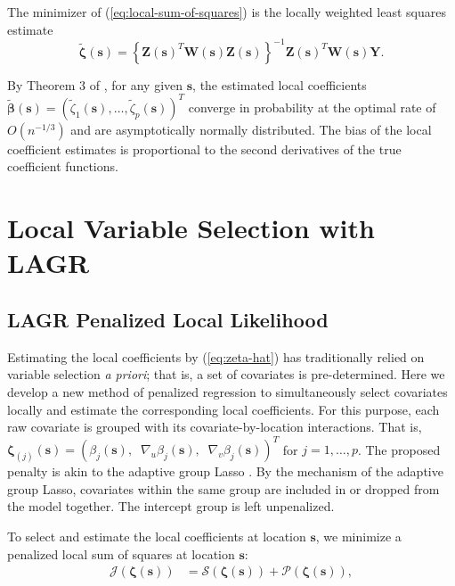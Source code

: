 \documentclass[authoryear,review, 12pt]{elsarticle}
\begin{document}
The minimizer of (\ref{eq:local-sum-of-squares}) is the locally weighted least squares estimate
\begin{equation}
\tilde{\bm{\zeta}}(\bm{s})=\left\{ \bm{Z}(\bm{s})^{T}\bm{W}\!(\bm{s})\bm{Z}(\bm{s})\right\} ^{-1}\bm{Z}(\bm{s})^{T}\bm{W}\!(\bm{s})\bm{Y}.\label{eq:zeta-hat}
\end{equation}

By Theorem 3 of \citet{Sun-Yan-Zhang-Lu-2014}, for any given $\bm{s}$,
the estimated local coefficients $\tilde{\bm{\beta}}(\bm{s})=\left(\tilde{\zeta}_{1}(\bm{s}),\dots,\tilde{\zeta}_{p}(\bm{s})\right)^{T}$
converge in probability at the optimal rate of $O\left(n^{-1/3}\right)$
and are asymptotically normally distributed. The bias of the local
coefficient estimates is proportional to the second derivatives of
the true coefficient functions.

\section{Local Variable Selection with LAGR\label{sec:lagr-gaussian}}

\subsection{LAGR Penalized Local Likelihood}

Estimating the local coefficients by (\ref{eq:zeta-hat}) has traditionally
relied on variable selection \emph{a priori}; that is, a set of covariates
is pre-determined. Here we develop a new method of penalized regression
to simultaneously select covariates locally and estimate the corresponding
local coefficients. For this purpose, each raw covariate is grouped
with its covariate-by-location interactions. That is, $\bm{\zeta}_{(j)}(\bm{s})=\left(\beta_{j}(\bm{s}),\;\;\nabla_{u}\beta_{j}(\bm{s}),\;\;\nabla_{v}\beta_{j}(\bm{s})\right)^{T}$
for $j=1,\dots,p$. The proposed penalty is akin to the adaptive
group Lasso \citep{Yuan-Lin-2006,Wang-Leng-2008}. By the mechanism
of the adaptive group Lasso, covariates within the same group are
included in or dropped from the model together. The intercept group
is left unpenalized.

To select and estimate the local coefficients at location $\bm{s}$,
we minimize a penalized local sum of squares at location $\bm{s}$:
\begin{align}
\mathcal{J}\left(\bm{\zeta}(\bm{s})\right) & =\mathcal{S}\left(\bm{\zeta}(\bm{s})\right)+\mathcal{P}\left(\bm{\zeta}(\bm{s})\right),\label{eq:penalized-least-squares}
\end{align}
\end{document}
